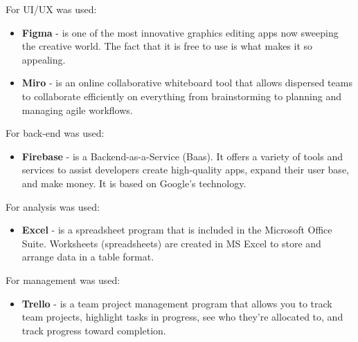 For UI/UX was used: 
\begin{itemize}
    \item \textbf{Figma} - is one of the most innovative graphics editing apps now sweeping the creative world. The fact that it is free to use is what makes it so appealing.
    \item \textbf{Miro} - is an online collaborative whiteboard tool that allows dispersed teams to collaborate efficiently on everything from brainstorming to planning and managing agile workflows.
\end{itemize}
For back-end was used:
\begin{itemize}
    \item \textbf{Firebase} - is a Backend-as-a-Service (Baas). It offers a variety of tools and services to assist developers create high-quality apps, expand their user base, and make money. It is based on Google's technology.
\end{itemize}
For analysis was used:
\begin{itemize}
    \item \textbf{Excel} - is a spreadsheet program that is included in the Microsoft Office Suite. Worksheets (spreadsheets) are created in MS Excel to store and arrange data in a table format.
\end{itemize}
For management was used: 
\begin{itemize}
    \item \textbf{Trello} -  is a team project management program that allows you to track team projects, highlight tasks in progress, see who they're allocated to, and track progress toward completion.
\end{itemize}
